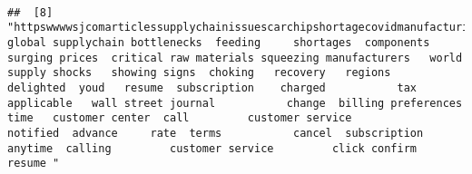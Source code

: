 \documentclass[
]{article}
\begin{document}
\begin{verbatim}
                                                                                                                                                                                                                                                                                                                                                                                                                                                                   
##  [8] "httpswwwwsjcomarticlessupplychainissuescarchipshortagecovidmanufacturingglobaleconomy global supplychain bottlenecks  feeding     shortages  components  surging prices  critical raw materials squeezing manufacturers   world   supply shocks   showing signs  choking   recovery   regions   delighted  youd   resume  subscription    charged           tax          applicable   wall street journal           change  billing preferences   time   customer center  call         customer service            notified  advance     rate  terms           cancel  subscription  anytime  calling         customer service         click confirm  resume "                                                                                                                                                                                                                                                                                                                                                                                                                                                                                                                                                                                                                                                                                                                                                                                                                                                                                                                                                                                                                                                                                                                                                                                                                                                                                                                                                                                                                                                                                                                                                                                                                                                                                                                                                                                                                                                                                                                                                                                                                                                                                                                                                                                                                                                                                                            
\end{verbatim}
\end{document}

